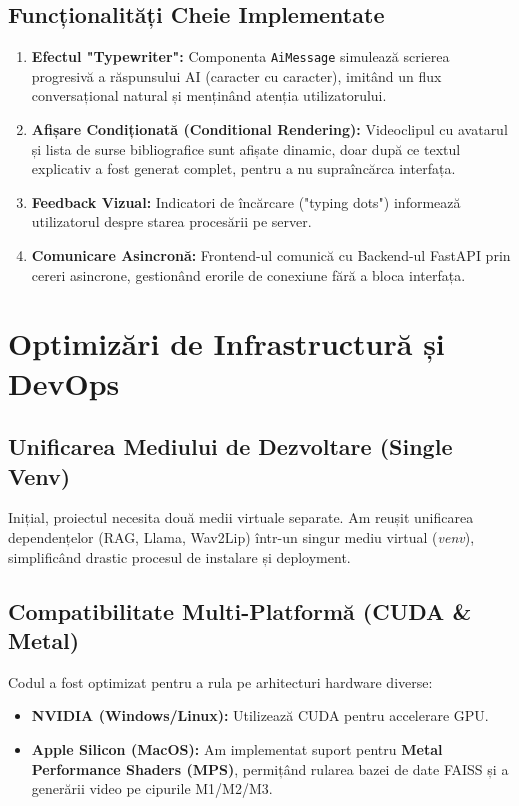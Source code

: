 \documentclass[12pt,a4paper]{report}
\begin{document}
\subsection{Funcționalități Cheie Implementate}
\begin{enumerate}
    \item \textbf{Efectul "Typewriter":} Componenta \texttt{AiMessage} simulează scrierea progresivă a răspunsului AI (caracter cu caracter), imitând un flux conversațional natural și menținând atenția utilizatorului.
    \item \textbf{Afișare Condiționată (Conditional Rendering):} Videoclipul cu avatarul și lista de surse bibliografice sunt afișate dinamic, doar după ce textul explicativ a fost generat complet, pentru a nu supraîncărca interfața.
    \item \textbf{Feedback Vizual:} Indicatori de încărcare ("typing dots") informează utilizatorul despre starea procesării pe server.
    \item \textbf{Comunicare Asincronă:} Frontend-ul comunică cu Backend-ul FastAPI prin cereri asincrone, gestionând erorile de conexiune fără a bloca interfața.
\end{enumerate}

\section{Optimizări de Infrastructură și DevOps}

\subsection{Unificarea Mediului de Dezvoltare (Single Venv)}
Inițial, proiectul necesita două medii virtuale separate. Am reușit unificarea dependențelor (RAG, Llama, Wav2Lip) într-un singur mediu virtual (\textit{venv}), simplificând drastic procesul de instalare și deployment.

\subsection{Compatibilitate Multi-Platformă (CUDA \& Metal)}
Codul a fost optimizat pentru a rula pe arhitecturi hardware diverse:
\begin{itemize}
    \item \textbf{NVIDIA (Windows/Linux):} Utilizează CUDA pentru accelerare GPU.
    \item \textbf{Apple Silicon (MacOS):} Am implementat suport pentru \textbf{Metal Performance Shaders (MPS)}, permițând rularea bazei de date FAISS și a generării video pe cipurile M1/M2/M3.
\end{itemize}
\end{document}
